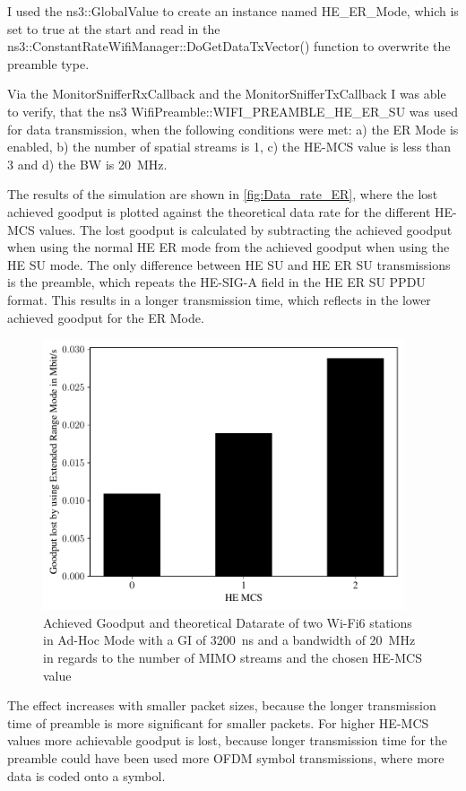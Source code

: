 I used the ns3::GlobalValue to create an instance named HE\_ER\_Mode, which is set to true at the start and read in the ns3::ConstantRateWifiManager::DoGetDataTxVector() function
to overwrite the preamble type.

Via the MonitorSnifferRxCallback and the MonitorSnifferTxCallback I was able to verify, that the ns3 WifiPreamble::WIFI\_PREAMBLE\_HE\_ER\_SU was used
for data transmission, when the following conditions were met: a) the \ac{ER} Mode is enabled, b) the number of spatial streams is \num{1}, c) the HE-\ac{MCS} value is less than \num{3} and
d) the \ac{BW} is \SI{20}{\mega\hertz}.

The results of the simulation are shown in \autoref{fig:Data_rate_ER}, where the lost achieved goodput is plotted against the theoretical data rate for the different HE-\ac{MCS} values.
The lost goodput is calculated by subtracting the achieved goodput when using the normal \ac{HE} \ac{ER} mode from the achieved goodput when using the \ac{HE} SU mode.
The only difference between \ac{HE} SU and \ac{HE} \ac{ER} SU transmissions is the preamble, which repeats the HE-SIG-A field in the \ac{HE} \ac{ER} SU \ac{PPDU} format.
This results in a longer transmission time, which reflects in the lower achieved goodput for the \ac{ER} Mode.
\begin{figure}[H]%
	\centering
	\includegraphics[width=0.95\textwidth]{figures/ER_dataRate_simulation.pdf}
	\caption{Achieved Goodput and theoretical Datarate of two Wi-Fi6 stations in Ad-Hoc Mode with a \acf{GI} of \SI{3200}{\nano\second} and a bandwidth of \SI{20}{\mega\hertz} in regards to the number of \acf{MIMO} streams and the chosen HE-\ac{MCS} value}%
	\label{fig:Data_rate_ER}%
\end{figure}
The effect increases with smaller packet sizes, because the longer transmission time of preamble is more significant for smaller packets.
For higher HE-\ac{MCS} values more achievable goodput is lost, because longer transmission time for the preamble could have
been used more \ac{OFDM} symbol transmissions, where more data is coded onto a symbol.



